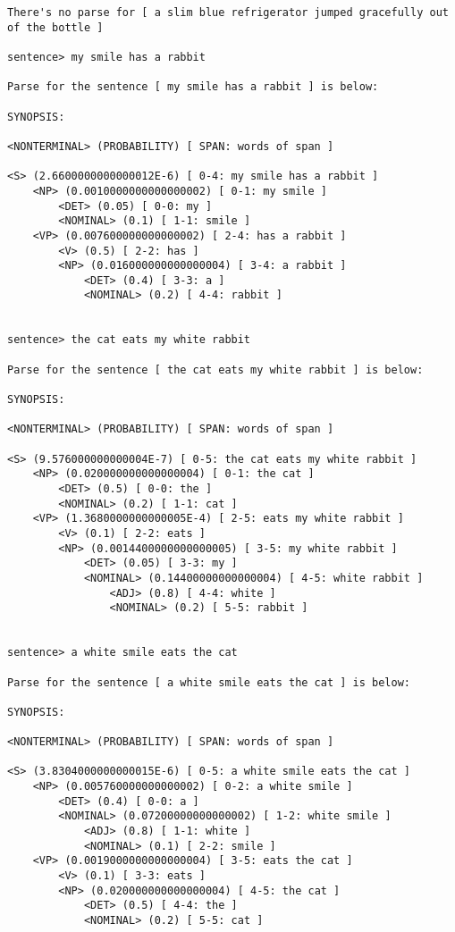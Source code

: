 \begin{verbatim}
There's no parse for [ a slim blue refrigerator jumped gracefully out of the bottle ]

sentence> my smile has a rabbit

Parse for the sentence [ my smile has a rabbit ] is below:

SYNOPSIS:

<NONTERMINAL> (PROBABILITY) [ SPAN: words of span ]

<S> (2.6600000000000012E-6) [ 0-4: my smile has a rabbit ]
    <NP> (0.0010000000000000002) [ 0-1: my smile ]
        <DET> (0.05) [ 0-0: my ]
        <NOMINAL> (0.1) [ 1-1: smile ]
    <VP> (0.007600000000000002) [ 2-4: has a rabbit ]
        <V> (0.5) [ 2-2: has ]
        <NP> (0.016000000000000004) [ 3-4: a rabbit ]
            <DET> (0.4) [ 3-3: a ]
            <NOMINAL> (0.2) [ 4-4: rabbit ]


sentence> the cat eats my white rabbit

Parse for the sentence [ the cat eats my white rabbit ] is below:

SYNOPSIS:

<NONTERMINAL> (PROBABILITY) [ SPAN: words of span ]

<S> (9.576000000000004E-7) [ 0-5: the cat eats my white rabbit ]
    <NP> (0.020000000000000004) [ 0-1: the cat ]
        <DET> (0.5) [ 0-0: the ]
        <NOMINAL> (0.2) [ 1-1: cat ]
    <VP> (1.3680000000000005E-4) [ 2-5: eats my white rabbit ]
        <V> (0.1) [ 2-2: eats ]
        <NP> (0.0014400000000000005) [ 3-5: my white rabbit ]
            <DET> (0.05) [ 3-3: my ]
            <NOMINAL> (0.14400000000000004) [ 4-5: white rabbit ]
                <ADJ> (0.8) [ 4-4: white ]
                <NOMINAL> (0.2) [ 5-5: rabbit ]


sentence> a white smile eats the cat

Parse for the sentence [ a white smile eats the cat ] is below:

SYNOPSIS:

<NONTERMINAL> (PROBABILITY) [ SPAN: words of span ]

<S> (3.8304000000000015E-6) [ 0-5: a white smile eats the cat ]
    <NP> (0.005760000000000002) [ 0-2: a white smile ]
        <DET> (0.4) [ 0-0: a ]
        <NOMINAL> (0.07200000000000002) [ 1-2: white smile ]
            <ADJ> (0.8) [ 1-1: white ]
            <NOMINAL> (0.1) [ 2-2: smile ]
    <VP> (0.0019000000000000004) [ 3-5: eats the cat ]
        <V> (0.1) [ 3-3: eats ]
        <NP> (0.020000000000000004) [ 4-5: the cat ]
            <DET> (0.5) [ 4-4: the ]
            <NOMINAL> (0.2) [ 5-5: cat ]



\end{verbatim}
